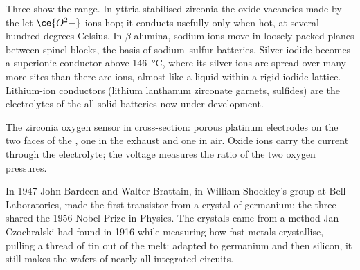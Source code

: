 Three  show the range. In yttria-stabilised zirconia the
oxide vacancies made by the  let $\ce{O^2-}$ ions hop; it conducts usefully
only when hot, at several hundred degrees Celsius. In $\beta$-alumina, sodium ions move in
loosely packed planes between spinel blocks, the basis of sodium--sulfur
batteries. Silver iodide becomes a superionic conductor above \qty{146}{\celsius},
where its silver ions are spread over many more sites than there are ions,
almost like a liquid within a rigid iodide lattice. Lithium-ion conductors
(lithium lanthanum zirconate garnets, sulfides) are the electrolytes of the
all-solid batteries now under development.

\begin{omfigure}

{\small The zirconia oxygen sensor in cross-section: porous platinum electrodes
on the two faces of the , one in the exhaust and one in air.
Oxide ions carry the current through the electrolyte; the voltage measures the
ratio of the two oxygen pressures.}
\end{omfigure}

\begin{history}
In 1947 John Bardeen and Walter Brattain, in William Shockley's group at Bell
Laboratories, made the first transistor from a crystal of germanium; the three
shared the 1956 Nobel Prize in Physics. The crystals came from a method Jan
Czochralski had found in 1916 while measuring how fast metals crystallise,
pulling a thread of tin out of the melt: adapted to germanium and then silicon,
it still makes the wafers of nearly all integrated circuits.
\end{history}


